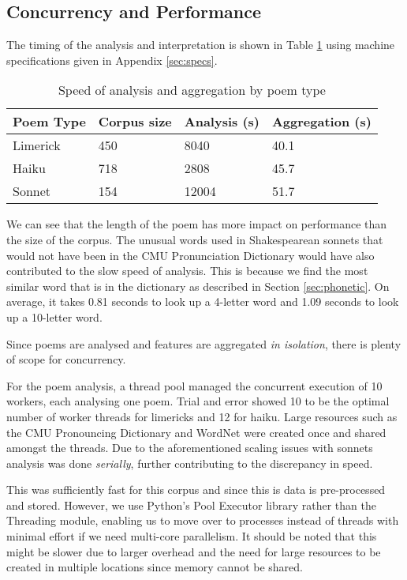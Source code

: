 \subsection{Concurrency and Performance}
\label{sec:interpret-perf}
The timing of the analysis and interpretation is shown in Table \ref{tab:ana-agg-speed} using machine specifications given in Appendix \ref{sec:specs}.

\begin{table}
\centering
    \begin{tabular}{|l|l|l|l|}
    \hline
    Poem Type & Corpus size & Analysis (s) & Aggregation (s) \\ \hline
    Limerick  & 450         & 8040        & 40.1           \\ \hline
    Haiku     & 718         & 2808        & 45.7           \\ \hline
    Sonnet    & 154         & 12004       & 51.7           \\ \hline
    \end{tabular}
\caption{Speed of analysis and aggregation by poem type}
\label{tab:ana-agg-speed}
\end{table}

We can see that the length of the poem has more impact on performance than the size of the corpus. The unusual words used in Shakespearean sonnets that would not have been in the CMU Pronunciation Dictionary would have also contributed to the slow speed of analysis. This is because we find the most similar word that is in the dictionary as described in Section \ref{sec:phonetic}. On average, it takes 0.81 seconds to look up a 4-letter word and 1.09 seconds to look up a 10-letter word.

Since poems are analysed and features are aggregated \textit{in isolation}, there is plenty of scope for concurrency.

For the poem analysis, a thread pool managed the concurrent execution of 10 workers, each analysing one poem. Trial and error showed 10 to be the optimal number of worker threads for limericks and 12 for haiku. Large resources such as the CMU Pronouncing Dictionary and WordNet were created once and shared amongst the threads. Due to the aforementioned scaling issues with sonnets analysis was done \textit{serially}, further contributing to the discrepancy in speed.

This was sufficiently fast for this corpus and since this is data is pre-processed and stored. However, we use Python's Pool Executor library rather than the Threading module, enabling us to move over to processes instead of threads with minimal effort if we need multi-core parallelism. It should be noted that this might be slower due to larger overhead and the need for large resources to be created in multiple locations since memory cannot be shared.

